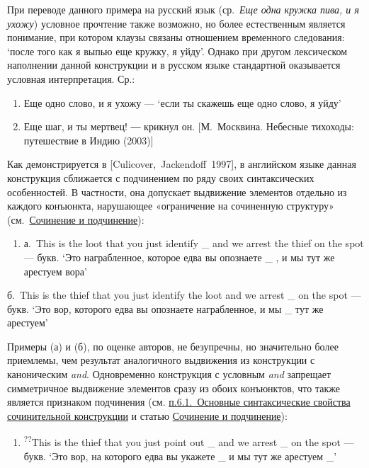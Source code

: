 При переводе данного примера на русский язык (ср.~\textit{Еще одна кружка
  пива, и я ухожу}) условное прочтение также возможно, но более
естественным является понимание, при котором клаузы связаны отношением
временного следования: `после того как я выпью еще кружку, я уйду'.
Однако при другом лексическом наполнении данной конструкции и в русском
языке стандартной оказывается условная интерпретация. Ср.:

\begin{enumerate}
  \def\labelenumi{(\arabic{enumi})}
  \setcounter{enumi}{57}
  \item
        Еще одно слово, и я ухожу --- `если ты скажешь еще одно слово, я уйду'
  \item
        Еще шаг, и ты мертвец! ― крикнул он. {[}М.~Москвина. Небесные
        тихоходы: путешествие в Индию (2003){]}
\end{enumerate}

Как демонстрируется в {[}Culicover,~Jackendoff~1997{]}, в английском
языке данная конструкция сближается с подчинением по ряду своих
синтаксических особенностей. В частности, она допускает выдвижение
элементов отдельно из каждого конъюнкта, нарушающее «ограничение на
сочиненную структуру» (см.~\underline{Сочинение и подчинение}):

\begin{enumerate}
  \def\labelenumi{(\arabic{enumi})}
  \setcounter{enumi}{59}
  \item
        а.~This is the loot that you just identify \_ and we arrest the thief
        on the spot --- букв. `Это награбленное, которое едва вы опознаете \_ ,
        и мы тут же арестуем вора'
\end{enumerate}

б.~This is the thief that you just identify the loot and we arrest \_ on
the spot --- букв. `Это вор, которого едва вы опознаете награбленное, и
мы \_ тут же арестуем'

Примеры (а) и (б), по оценке авторов, не безупречны, но значительно
более приемлемы, чем результат аналогичного выдвижения из конструкции с
каноническим \textit{and}. Одновременно конструкция с условным \textit{and}
запрещает симметричное выдвижение элементов сразу из обоих конъюнктов,
что также является признаком подчинения (см. \underline{п.6.1.~Основные
  синтаксические свойства сочинительной конструкции} и статью
\underline{Сочинение и подчинение}):

\begin{enumerate}
  \def\labelenumi{(\arabic{enumi})}
  \setcounter{enumi}{60}
  \item
        \textsuperscript{??}This is the thief that you just point out \_ and
        we arrest \_ on the spot --- букв. `Это вор, на которого едва вы
        укажете \_ и мы тут же арестуем \_'
\end{enumerate}

